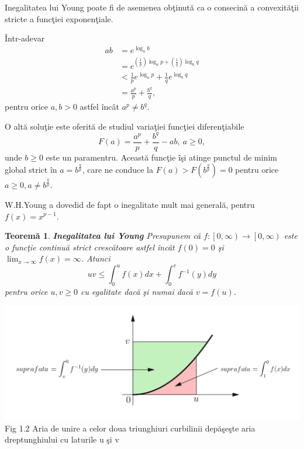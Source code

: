 \documentclass[a4paper,12pt,oneside]{report}
\newtheorem{theorem}{Teorem\u a}
\begin{document}
Inegalitatea lui Young poate fi de asemenea ob\c{t}inut\u{a} ca o consecin\u{a} a convexit\u{a}\c{t}ii stricte a func\c{t}iei exponen\c{t}iale.

\^{I}ntr-adevar
\begin{equation} \nonumber
    \begin{split}
        ab & =  e^{\log_{a}b} \\ & = e^{\left (\frac{1}{p}  \right )\log_{a}p+ \left ( \frac{1}{q} \right )\log_{b}q} \\ & < \frac{1}{p}e^{\log_{a}p}+\frac{1}{q}e^{\log_{b}q} \\ & = \frac{a^{p}}{p}+\frac{b^{q}}{q},
    \end{split}
\end{equation}
pentru orice \(a,b>0\) astfel \^{i}nc\^{a}t \(a^{p}\neq b^{q}\).

O alt\u{a} solu\c{t}ie este oferit\u{a} de studiul varia\c{t}iei func\c{t}iei diferen\c{t}iabile
\begin{displaymath}
  F\left ( a \right )= \frac{a^{p}}{p}+\frac{b^{q}}{q} - ab,~ a\geq 0,
\end{displaymath}
unde \(b\geq 0\) este un paramentru. Aceast\u{a} func\c{t}ie \^{i}\c{s}i atinge punctul de minim global strict \^{i}n \(a= b^{\frac{q}{p}}\), care ne conduce la \(F\left ( a \right )> F\left ( b^{\frac{q}{p}} \right ) = 0\) pentru orice \(a\geq 0, a\neq b^{\frac{q}{p}}\).

  W.H.Young a dovedid de fapt  o inegalitate mult mai general\u{a}, pentru \(f\left ( x \right )=  x^{p-1}\).

\begin{theorem}
\textbf{Inegalitatea lui Young
}
Presupunem c\u{a} \(f: \left [ 0,\infty  \right ) \rightarrow \left [ 0,\infty  \right )\) este o func\c{t}ie continu\u{a} strict cresc\u{a}toare astfel \^{i}nc\^{a}t \(f\left ( 0 \right )= 0\) \c{s}i \(\lim_{x\rightarrow \infty }f\left ( x \right )= \infty\). Atunci
\begin{displaymath}
  uv\leq \int_{0}^{u}f\left ( x \right )dx + \int_{0}^{v}f^{-1}\left ( y \right )dy
\end{displaymath}
pentru orice \(u,v\geq 0\) cu egalitate dac\u{a} \c{s}i numai dac\u{a} \( v = f\left ( u \right )\).
\end{theorem}
\begin{center}
  \includegraphics[width=1.0\textwidth]{fig1.2.png}
  \\ Fig 1.2 Aria  de unire a celor doua triunghiuri curbilinii dep\u{a}\c{s}e\c{s}te aria dreptunghiului cu laturile u \c{s}i v
\end{center}
\end{document}
